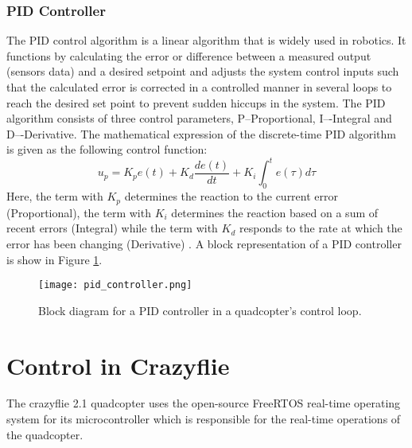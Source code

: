 \documentclass[10pt, a4paper]{article}
\newcommand{\fig}[1]{Figure \ref{#1}}
\begin{document}
    \subsubsection{PID Controller}
    The PID control algorithm is a linear algorithm that is widely used in robotics. It functions by calculating the error or difference between a measured output (sensors data) and a desired setpoint and adjusts the system control inputs such that the calculated error is corrected in a controlled manner in several loops to reach the desired set point to prevent sudden hiccups in the system. The PID algorithm consists of three control parameters,  P--Proportional, I–-Integral and D–-Derivative. The mathematical expression of the discrete-time PID algorithm is given as the following control function: $$u_p = K_pe(t) + K_d\frac{de(t)}{dt} + K_i \int_0^te(\tau)d\tau$$ Here, the term with $K_p$ determines the reaction to the current error (Proportional), the term with $K_i$ determines the reaction based on a sum of recent errors (Integral) while the term with $K_d$ responds to the rate at which the error has been changing (Derivative) \cite{IIJEM}. A block representation of a PID controller is show in \fig{PID block}.

\begin{figure}[hbt!]
    \centering
    \texttt{[image: pid\_controller.png]}
    \caption{Block diagram for a PID controller in a quadcopter's control loop.}
    \label{PID block}
\end{figure}

\section{Control in Crazyflie}
    The crazyflie 2.1 quadcopter uses the open-source FreeRTOS real-time operating system for its microcontroller \cite{bitcraze_freeRTOS} which is responsible for the real-time operations of the quadcopter.
    
\end{document}
